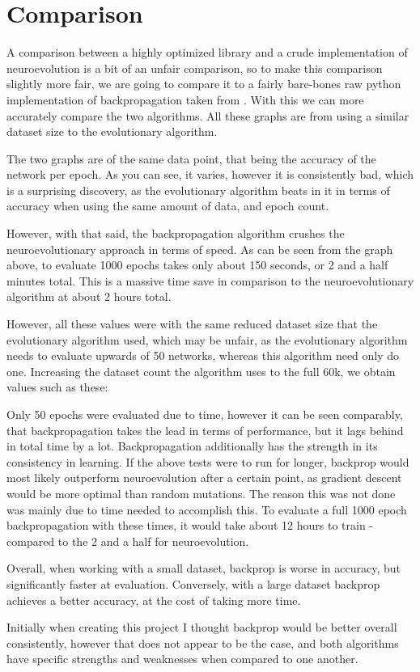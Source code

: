 \documentclass[12pt]{report}
\begin{document}
\section*{Comparison}
A comparison between a highly optimized library and a crude implementation of neuroevolution
is a bit of an unfair comparison, so to make this comparison slightly more fair, we
are going to compare it to a fairly bare-bones raw python implementation of
backpropagation taken from \cite{hansen_2020}. With this we can more accurately compare the two
algorithms. All these graphs are from using a similar dataset size
to the evolutionary algorithm.


The two graphs are of the same data point, that being the accuracy of the network
per epoch. As you can see, it varies, however it is consistently bad, which is
a surprising discovery, as the evolutionary algorithm beats in it in terms of accuracy
when using the same amount of data, and epoch count.


However, with that said, the backpropagation algorithm crushes the neuroevolutionary
approach in terms of speed. As can be seen from the graph above, to evaluate
1000 epochs takes only about 150 seconds, or 2 and a half minutes total. This
is a massive time save in comparison to the neuroevolutionary algorithm at
about 2 hours total.

\par However, all these values were with the same reduced dataset size that
the evolutionary algorithm used, which may be unfair, as the evolutionary algorithm
needs to evaluate upwards of 50 networks, whereas this algorithm need only do one.
Increasing the dataset count the algorithm uses to the full 60k,
we obtain values such as these:


Only 50 epochs were evaluated due to time, however it can be seen comparably, that
backpropagation takes the lead in terms of performance, but it lags behind in total time by a lot.
Backpropagation additionally has the strength in its consistency
in learning. If the above tests were to run for longer,
backprop would most likely outperform neuroevolution after a certain point, as 
gradient descent would be more optimal than random mutations. The reason this was not
done was mainly due to time needed to accomplish this. To evaluate a full 1000 epoch
backpropagation with these times, it would take about 12 hours to train - compared to
the 2 and a half for neuroevolution.
\par Overall, when working with a small dataset, backprop is worse in accuracy, but
significantly faster at evaluation. Conversely, with a large dataset backprop
achieves a better accuracy, at the cost of taking more time. 
\par Initially when creating this project
I thought backprop would be better overall consistently, however that does not appear
to be the case, and both algorithms have specific strengths and weaknesses when
compared to one another. 
\end{document}
